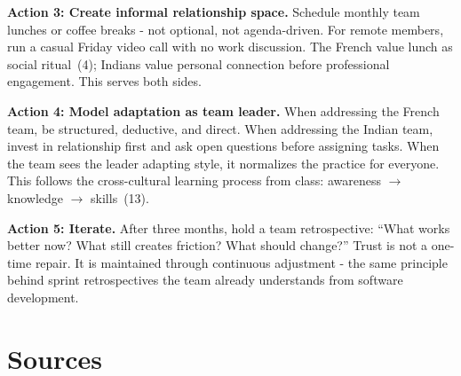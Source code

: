 \documentclass[12pt, a4paper]{article}
\begin{document}
\textbf{Action 3: Create informal relationship space.} Schedule monthly team lunches or coffee breaks - not optional, not agenda-driven. For remote members, run a casual Friday video call with no work discussion. The French value lunch as social ritual~(4); Indians value personal connection before professional engagement. This serves both sides.

\textbf{Action 4: Model adaptation as team leader.} When addressing the French team, be structured, deductive, and direct. When addressing the Indian team, invest in relationship first and ask open questions before assigning tasks. When the team sees the leader adapting style, it normalizes the practice for everyone. This follows the cross-cultural learning process from class: awareness $\rightarrow$ knowledge $\rightarrow$ skills~(13).


\vspace{1em}
\textbf{Action 5: Iterate.} After three months, hold a team retrospective: ``What works better now? What still creates friction? What should change?'' Trust is not a one-time repair. It is maintained through continuous adjustment - the same principle behind sprint retrospectives the team already understands from software development.

\newpage
\section*{Sources}
\end{document}
